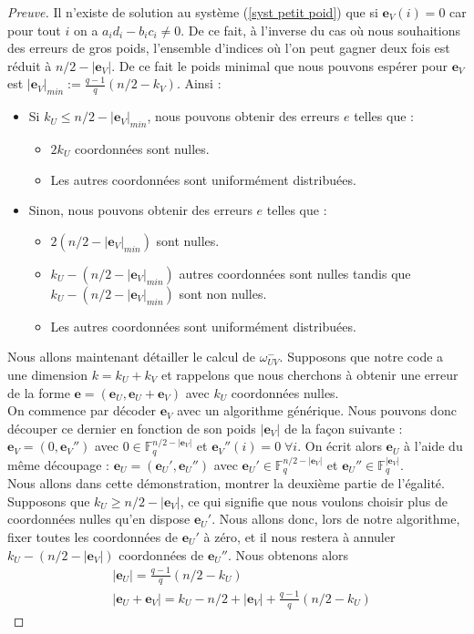 \documentclass[12pt]{article}
\theoremstyle{plain}
\theoremstyle{definition}
\newcommand{\F}{\mathbb{F}}
\newcommand{\e}{\mathbf{e}}
\begin{document}
\begin{proof}[Preuve]
Il n'existe de solution au système (\ref{syst petit poid}) que si $\e_V(i)=0$ car pour tout $i$ on a $a_id_i -b_ic_i \neq 0$. De ce fait, à l'inverse du cas où nous souhaitions des erreurs de gros poids, l'ensemble d'indices où l'on peut gagner deux fois est réduit à $n/2 - |\e_V|$. De ce fait le poids minimal que nous pouvons espérer pour $\e_V$ est $|\e_V|_{min} := \frac{q-1}{q}(n/2-k_V)$. Ainsi :
\begin{itemize}
\item Si $k_U \leq n/2 - |\e_V|_{min}$, nous pouvons obtenir des erreurs $e$ telles que :
	\begin{itemize}
	\item $2k_U$ coordonnées sont nulles.
	\item Les autres coordonnées sont uniformément distribuées.
	\end{itemize}
\item Sinon, nous pouvons obtenir des erreurs $e$ telles que :
	\begin{itemize}
	\item $2(n/2 - |\e_V|_{min})$ sont nulles.
	\item $k_U - (n/2 - |\e_V|_{min})$ autres coordonnées sont nulles tandis que $k_U - (n/2 - |\e_V|_{min})$ sont non nulles.
	\item Les autres coordonnées sont uniformément distribuées.
	\end{itemize}
\end{itemize} 


\noindent Nous allons maintenant détailler le calcul de $\omega_{UV}^-$. Supposons que notre code a une dimension $k = k_U + k_V$ et rappelons que nous cherchons à obtenir une erreur de la forme $\e = (\e_U,\e_U + \e_V)$ avec $k_U$ coordonnées nulles.\\
\noindent On commence par décoder $\e_V$ avec un algorithme générique. 
Nous pouvons donc découper ce dernier en fonction de son poids $|\e_V|$ de la façon suivante : $ \e_V = (0, \e_V'')$ avec $0 \in \F_q^{n/2-|\e_V|}$ et $\e_V''(i) = 0 \;\forall i$.
On écrit alors $\e_U$ à l'aide du même découpage : $\e_U = (\e_U', \e_U'')$ avec $\e_U' \in \F_q^{n/2-|\e_V|}$ et $\e_U'' \in \F_q^{|\e_V|}$.\\

\noindent Nous allons dans cette démonstration, montrer la deuxième partie de l'égalité. Supposons que $k_U \geq n/2 - |\e_V|$, ce qui signifie que nous voulons choisir plus de coordonnées nulles qu'en dispose $\e_U'$. 
Nous allons donc, lors de notre algorithme, fixer toutes les coordonnées de $\e_U'$ à zéro, et il nous restera à annuler $k_U - (n/2 -|\e_V|)$ coordonnées de $\e_U''$.
Nous obtenons alors 
\begin{equation*}
\begin{split}
&|\e_U| = \frac{q-1}{q}(n/2-k_U) \\
&|\e_U + \e_V| = k_U - n/2 + |\e_V| + \frac{q-1}{q}(n/2 -k_U)
\end{split}
\end{equation*}


\end{proof}
\end{document}
